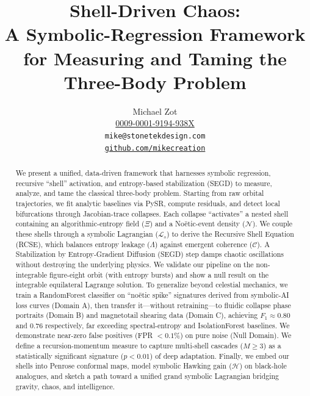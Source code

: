 \documentclass[11pt]{article}
\title{Shell-Driven Chaos:\\
       A Symbolic-Regression Framework for Measuring and Taming the Three-Body Problem}
\author{%
  Michael Zot\\
  \href{https://orcid.org/0009-0001-9194-938X}{0009-0001-9194-938X}\\
  \small\texttt{mike@stonetekdesign.com}\\
  \href{https://github.com/mikecreation}{\texttt{github.com/mikecreation}}
}
\newcommand{\Contradiction}{\Xi}
\newcommand{\Coherence}{\mathcal{C}}
\newcommand{\Noetic}{\mathcal{N}}
\newcommand{\Leak}{\Lambda}
\newcommand{\Lag}{\mathcal{L}_s}
\newcommand{\Hgain}{\mathcal{H}}
\begin{document}
\maketitle

\begin{abstract}
We present a unified, data-driven framework that harnesses symbolic regression, recursive “shell” activation, and entropy-based stabilization (SEGD) to measure, analyze, and tame the classical three-body problem. Starting from raw orbital trajectories, we fit analytic baselines via PySR, compute residuals, and detect local bifurcations through Jacobian-trace collapses. Each collapse “activates” a nested shell containing an algorithmic-entropy field (\(\Contradiction\)) and a Noëtic-event density (\(\Noetic\)). We couple these shells through a symbolic Lagrangian (\(\Lag\)) to derive the Recursive Shell Equation (RCSE), which balances entropy leakage (\(\Leak\)) against emergent coherence (\(\Coherence\)). A Stabilization by Entropy‐Gradient Diffusion (SEGD) step damps chaotic oscillations without destroying the underlying physics. We validate our pipeline on the non-integrable figure-eight orbit (with entropy bursts) and show a null result on the integrable equilateral Lagrange solution. To generalize beyond celestial mechanics, we train a RandomForest classifier on “noëtic spike” signatures derived from symbolic-AI loss curves (Domain A), then transfer it—without retraining—to fluidic collapse phase portraits (Domain B) and magnetotail shearing data (Domain C), achieving \(F_{1} \approx 0.80\) and \(0.76\) respectively, far exceeding spectral-entropy and IsolationForest baselines. We demonstrate near-zero false positives (FPR \(<0.1\%\)) on pure noise (Null Domain). We define a recursion-momentum measure to capture multi‐shell cascades (\(M \ge 3\)) as a statistically significant signature (\(p<0.01\)) of deep adaptation. Finally, we embed our shells into Penrose conformal maps, model symbolic Hawking gain (\(\Hgain\)) on black-hole analogues, and sketch a path toward a unified grand symbolic Lagrangian bridging gravity, chaos, and intelligence.
\end{abstract}

\end{document}
